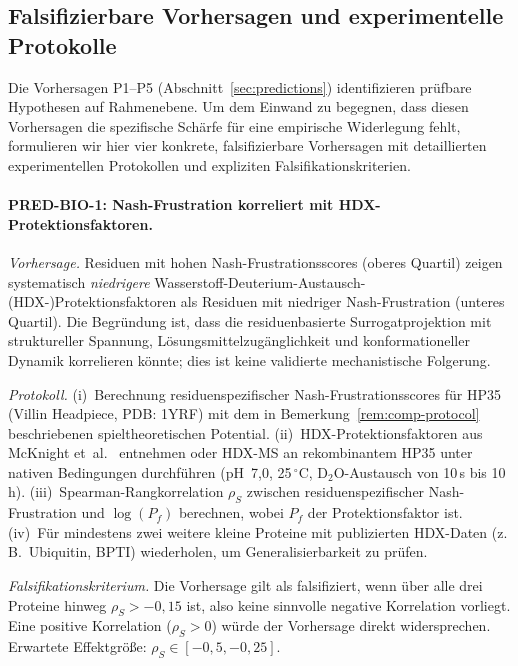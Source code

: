 \documentclass[12pt,a4paper]{article}
\theoremstyle{remark}
\begin{document}
\subsection{Falsifizierbare Vorhersagen und experimentelle Protokolle}
\label{sec:falsifiable-predictions}

Die Vorhersagen P1--P5 (Abschnitt~\ref{sec:predictions}) identifizieren prüfbare Hypothesen auf Rahmenebene. Um dem Einwand zu begegnen, dass diesen Vorhersagen die spezifische Schärfe für eine empirische Widerlegung fehlt, formulieren wir hier vier konkrete, falsifizierbare Vorhersagen mit detaillierten experimentellen Protokollen und expliziten Falsifikationskriterien.

\paragraph{PRED-BIO-1: Nash-Frustration korreliert mit HDX-Protektionsfaktoren.}

\textit{Vorhersage.}
Residuen mit hohen Nash-Frustrationsscores (oberes Quartil) zeigen systematisch \emph{niedrigere} Wasserstoff-Deuterium-Austausch-(HDX-)Protektionsfaktoren als Residuen mit niedriger Nash-Frustration (unteres Quartil). Die Begründung ist, dass die residuenbasierte Surrogatprojektion mit struktureller Spannung, Lösungsmittelzugänglichkeit und konformationeller Dynamik korrelieren könnte; dies ist keine validierte mechanistische Folgerung.

\textit{Protokoll.}
(i)~Berechnung residuenspezifischer Nash-Frustrationsscores für HP35 (Villin Headpiece, PDB: 1YRF) mit dem in Bemerkung~\ref{rem:comp-protocol} beschriebenen spieltheoretischen Potential.
(ii)~HDX-Protektionsfaktoren aus McKnight et~al.~\cite{McKnight1996} entnehmen oder HDX-MS an rekombinantem HP35 unter nativen Bedingungen durchführen (pH~7{,}0, 25$\,^\circ$C, $\text{D}_2\text{O}$-Austausch von 10\,s bis 10\,h).
(iii)~Spearman-Rangkorrelation $\rho_S$ zwischen residuenspezifischer Nash-Frustration und $\log(P_f)$ berechnen, wobei $P_f$ der Protektionsfaktor ist.
(iv)~Für mindestens zwei weitere kleine Proteine mit publizierten HDX-Daten (z.\,B.\ Ubiquitin, BPTI) wiederholen, um Generalisierbarkeit zu prüfen.

\textit{Falsifikationskriterium.}
Die Vorhersage gilt als falsifiziert, wenn über alle drei Proteine hinweg $\rho_S > -0{,}15$ ist, also keine sinnvolle negative Korrelation vorliegt. Eine positive Korrelation ($\rho_S > 0$) würde der Vorhersage direkt widersprechen. Erwartete Effektgröße: $\rho_S \in [-0{,}5, -0{,}25]$.
\end{document}

